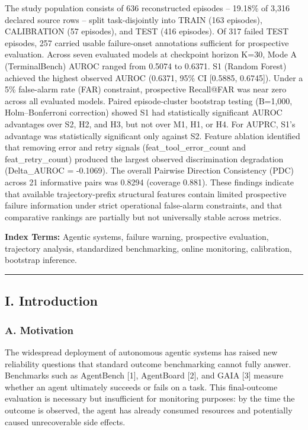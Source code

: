 \documentclass[
]{article}
\begin{document}
The study population consists of 636 reconstructed episodes -- 19.18\%
of 3,316 declared source rows -- split task-disjointly into TRAIN (163
episodes), CALIBRATION (57 episodes), and TEST (416 episodes). Of 317
failed TEST episodes, 257 carried usable failure-onset annotations
sufficient for prospective evaluation. Across seven evaluated models at
checkpoint horizon K=30, Mode A (TerminalBench) AUROC ranged from 0.5074
to 0.6371. S1 (Random Forest) achieved the highest observed AUROC
(0.6371, 95\% CI {[}0.5885, 0.6745{]}). Under a 5\% false-alarm rate
(FAR) constraint, prospective Recall@FAR was near zero across all
evaluated models. Paired episode-cluster bootstrap testing (B=1,000,
Holm--Bonferroni correction) showed S1 had statistically significant
AUROC advantages over S2, H2, and H3, but not over M1, H1, or H4. For
AUPRC, S1's advantage was statistically significant only against S2.
Feature ablation identified that removing error and retry signals
(feat\_tool\_error\_count and feat\_retry\_count) produced the largest
observed discrimination degradation (Delta\_AUROC = -0.1069). The
overall Pairwise Direction Consistency (PDC) across 21 informative pairs
was 0.8294 (coverage 0.881). These findings indicate that available
trajectory-prefix structural features contain limited prospective
failure information under strict operational false-alarm constraints,
and that comparative rankings are partially but not universally stable
across metrics.

\textbf{Index Terms:} Agentic systems, failure warning, prospective
evaluation, trajectory analysis, standardized benchmarking, online
monitoring, calibration, bootstrap inference.

\begin{center}\rule{0.5\linewidth}{0.5pt}\end{center}

\subsection{I. Introduction}\label{i.-introduction}

\subsubsection{A. Motivation}\label{a.-motivation}

The widespread deployment of autonomous agentic systems has raised new
reliability questions that standard outcome benchmarking cannot fully
answer. Benchmarks such as AgentBench {[}1{]}, AgentBoard {[}2{]}, and
GAIA {[}3{]} measure whether an agent ultimately succeeds or fails on a
task. This final-outcome evaluation is necessary but insufficient for
monitoring purposes: by the time the outcome is observed, the agent has
already consumed resources and potentially caused unrecoverable side
effects.
\end{document}
